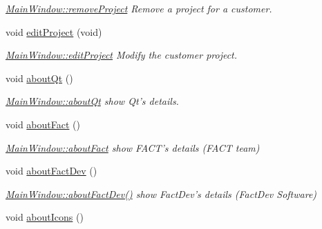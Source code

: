\begin{DoxyCompactItemize}
\begin{DoxyCompactList}\small\item\em \hyperlink{classGui_1_1MainWindow_a7e00765c3da7a97ba937bdecb095200b}{Main\+Window\+::remove\+Project} Remove a project for a customer. \end{DoxyCompactList}\item 
\hypertarget{classGui_1_1MainWindow_adade8f873eb855b2ca0bb851c91cc5a9}{void \hyperlink{classGui_1_1MainWindow_adade8f873eb855b2ca0bb851c91cc5a9}{edit\+Project} (void)}\label{classGui_1_1MainWindow_adade8f873eb855b2ca0bb851c91cc5a9}

\begin{DoxyCompactList}\small\item\em \hyperlink{classGui_1_1MainWindow_adade8f873eb855b2ca0bb851c91cc5a9}{Main\+Window\+::edit\+Project} Modify the customer project. \end{DoxyCompactList}\item 
\hypertarget{classGui_1_1MainWindow_a6df8072789ea8ec81ca2dd8fa78a4b01}{void \hyperlink{classGui_1_1MainWindow_a6df8072789ea8ec81ca2dd8fa78a4b01}{about\+Qt} ()}\label{classGui_1_1MainWindow_a6df8072789ea8ec81ca2dd8fa78a4b01}

\begin{DoxyCompactList}\small\item\em \hyperlink{classGui_1_1MainWindow_a6df8072789ea8ec81ca2dd8fa78a4b01}{Main\+Window\+::about\+Qt} show Qt's details. \end{DoxyCompactList}\item 
\hypertarget{classGui_1_1MainWindow_a26726203b873f41f607d78c5d5619c7d}{void \hyperlink{classGui_1_1MainWindow_a26726203b873f41f607d78c5d5619c7d}{about\+Fact} ()}\label{classGui_1_1MainWindow_a26726203b873f41f607d78c5d5619c7d}

\begin{DoxyCompactList}\small\item\em \hyperlink{classGui_1_1MainWindow_a26726203b873f41f607d78c5d5619c7d}{Main\+Window\+::about\+Fact} show F\+A\+C\+T's details (F\+A\+C\+T team) \end{DoxyCompactList}\item 
\hypertarget{classGui_1_1MainWindow_a39fe49fec47b6cbe4c8664d97bc47e0f}{void \hyperlink{classGui_1_1MainWindow_a39fe49fec47b6cbe4c8664d97bc47e0f}{about\+Fact\+Dev} ()}\label{classGui_1_1MainWindow_a39fe49fec47b6cbe4c8664d97bc47e0f}

\begin{DoxyCompactList}\small\item\em \hyperlink{classGui_1_1MainWindow_a39fe49fec47b6cbe4c8664d97bc47e0f}{Main\+Window\+::about\+Fact\+Dev()} show Fact\+Dev's details (Fact\+Dev Software) \end{DoxyCompactList}\item 
\hypertarget{classGui_1_1MainWindow_a56db09003bd79c8635488d0edc57cdb3}{void \hyperlink{classGui_1_1MainWindow_a56db09003bd79c8635488d0edc57cdb3}{about\+Icons} ()}\label{classGui_1_1MainWindow_a56db09003bd79c8635488d0edc57cdb3}


\end{DoxyCompactItemize}

